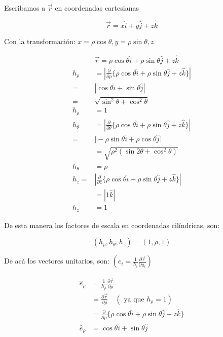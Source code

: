 Escribamos a $\vec{r}$ en coordenadas cartesianas

$$
\vec{r}=x \hat{i}+y \hat{j}+z \hat{k}
$$

Con la transformación: $x=\rho \cos \theta, y=\rho \sin \theta, z$

$$
\begin{aligned}
& \vec{r}=\rho \cos \theta \hat{i}+\rho \sin \theta \hat{j}+z \hat{k} \\
h_{\rho} & =\left|\frac{\partial}{\partial \rho}\{\rho \cos \theta \hat{i}+\rho \sin \theta \hat{j}+z \hat{k}\}\right| \\
= & |\cos \theta \hat{i}+\sin \theta \hat{j}| \\
= & \sqrt{\sin ^{2} \theta+\cos ^{2} \theta} \\
h_{\rho} & =1 \\
h_{\theta} & =\left|\frac{\partial}{\partial \theta}\{\rho \cos \theta \hat{i}+\rho \sin \theta \hat{j}+z \hat{k}\}\right| \\
= & \mid-\rho \sin \theta \hat{i}+\rho \cos \theta \hat{j}\rceil \\
& =\sqrt{\rho^{2}\left(\sin 2 \theta+\cos ^{2} \theta\right)} \\
h_{\theta} & =\rho \\
h_{z}= & \left|\frac{\partial}{\partial z}\{\rho \cos \theta \hat{i}+\rho \sin \theta \hat{j}+z \hat{k}\}\right| \\
& =|1 \hat{k}| \\
h_{z} & =1
\end{aligned}
$$

De esta manera los factores de escala en coordenadas cilíndricas, son:

$$
\left(h_{\rho}, h_{\theta}, h_{z}\right)=(1, \rho, 1)
$$

De acá los vectores unitarios, son: $\left(\widehat{e}_{i}=\frac{1}{h_{i}} \frac{\partial \vec{r}}{\partial u_{i}}\right)$

$$
\begin{aligned}
\widehat{e}_{\rho} & =\frac{1}{h_{\rho}} \frac{\partial \vec{r}}{\partial \rho} \\
& =\frac{\partial \vec{r}}{\partial \rho} \quad\left(\text { ya que } h_{\rho}=1\right) \\
& =\frac{\partial}{\partial \rho}\{\rho \cos \theta \hat{i}+\rho \sin \theta \hat{j}+z \hat{k}\} \\
\hat{e}_{\rho} & =\cos \theta \hat{i}+\sin \theta \hat{j}
\end{aligned}
$$

